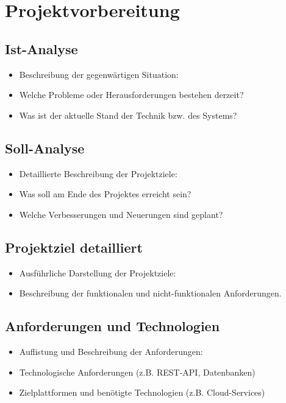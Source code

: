 
\section{Projektvorbereitung}\label{projektvorbereitung}

\subsection{Ist-Analyse}\label{ist-analyse}

\begin{itemize}
  \item
        Beschreibung der gegenwärtigen Situation:
  \item
        Welche Probleme oder Herausforderungen bestehen derzeit?
  \item
        Was ist der aktuelle Stand der Technik bzw. des Systems?
\end{itemize}

\subsection{Soll-Analyse}\label{soll-analyse}

\begin{itemize}
  \item
        Detaillierte Beschreibung der Projektziele:
  \item
        Was soll am Ende des Projektes erreicht sein?
  \item
        Welche Verbesserungen und Neuerungen sind geplant?
\end{itemize}

\subsection{Projektziel detailliert}\label{projektziel-detailliert}

\begin{itemize}
  \item
        Ausführliche Darstellung der Projektziele:
  \item
        Beschreibung der funktionalen und nicht-funktionalen Anforderungen.
\end{itemize}

\subsection{Anforderungen und Technologien}\label{anforderungen-und-technologien}

\begin{itemize}
  \item
        Auflistung und Beschreibung der Anforderungen:
  \item
        Technologische Anforderungen (z.B. REST-API, Datenbanken)
  \item
        Zielplattformen und benötigte Technologien (z.B. Cloud-Services)
\end{itemize}